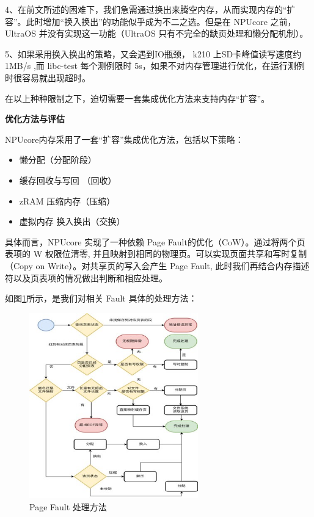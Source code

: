 4、在前文所述的困难下，我们急需通过换出来腾空内存，从而实现内存的“扩容”。此时增加“换入换出”的功能似乎成为不二之选。但是在 NPUcore 之前， UltraOS 并没有实现这一功能（UltraOS 只有不完全的缺页处理和懒分配机制）。

5、如果采用换入换出的策略，又会遇到IO瓶颈， k210 上SD卡峰值读写速度约 1MB/s ,而 libc-test 每个测例限时 5s，如果不对内存管理进行优化，在运行测例时很容易就出现超时。

在以上种种限制之下，迫切需要一套集成优化方法来支持内存“扩容”。 


\textbf{优化方法与评估}

NPUcore内存采用了一套“扩容”集成优化方法，包括以下策略：

\begin{itemize}
	\item 懒分配（分配阶段）
	\item 缓存回收与写回 （回收）
	\item zRAM 压缩内存（压缩）
	\item 虚拟内存 换入换出（交换）
	\end{itemize}

具体而言，NPUcore 实现了一种依赖 Page Fault的优化（CoW）。通过将两个页表项的 W 权限位清零, 并且映射到相同的物理页。可以实现页面共享和写时复制（Copy on Write）。对共享页的写入会产生 Page Fault, 此时我们再结合内存描述符以及页表项的情况做出判断和相应处理。

如图\ref{fig:page fault}所示，是我们对相关 Fault 具体的处理方法：

\begin{figure}[h]
	\centering
	\includegraphics[width=0.65\textwidth]{figures/10-04-Page fault.jpg}
	\caption{Page Fault 处理方法}
	\label{fig:page fault}
\end{figure}

